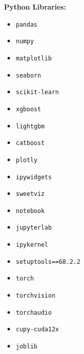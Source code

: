 ﻿\documentclass{article}
\begin{document}
\textbf{Python Libraries:}
\begin{itemize}
	\item \texttt{pandas}
	\item \texttt{numpy}
	\item \texttt{matplotlib}
	\item \texttt{seaborn}
	\item \texttt{scikit-learn}
	\item \texttt{xgboost}
	\item \texttt{lightgbm}
	\item \texttt{catboost}
	\item \texttt{plotly}
	\item \texttt{ipywidgets}
	\item \texttt{sweetviz}
	\item \texttt{notebook}
	\item \texttt{jupyterlab}
	\item \texttt{ipykernel}
	\item \texttt{setuptools==68.2.2}
	\item \texttt{torch}
	\item \texttt{torchvision}
	\item \texttt{torchaudio}
	\item \texttt{cupy-cuda12x}
	\item \texttt{joblib}
\end{itemize}



\end{document}
